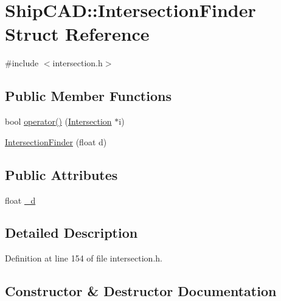 \hypertarget{structShipCAD_1_1IntersectionFinder}{}\section{Ship\+C\+AD\+:\+:Intersection\+Finder Struct Reference}
\label{structShipCAD_1_1IntersectionFinder}


{\ttfamily \#include $<$intersection.\+h$>$}

\subsection*{Public Member Functions}
\begin{DoxyCompactItemize}
\item 
bool \hyperlink{structShipCAD_1_1IntersectionFinder_a7b3611a20a76f5c32169aa35350549a7}{operator()} (\hyperlink{classShipCAD_1_1Intersection}{Intersection} $\ast$i)
\item 
\hyperlink{structShipCAD_1_1IntersectionFinder_a9208cde01b362db91b0860b17dae4dd4}{Intersection\+Finder} (float d)
\end{DoxyCompactItemize}
\subsection*{Public Attributes}
\begin{DoxyCompactItemize}
\item 
float \hyperlink{structShipCAD_1_1IntersectionFinder_a3155359937831f04d1f44ad660463f30}{\+\_\+d}
\end{DoxyCompactItemize}


\subsection{Detailed Description}


Definition at line 154 of file intersection.\+h.



\subsection{Constructor \& Destructor Documentation}
